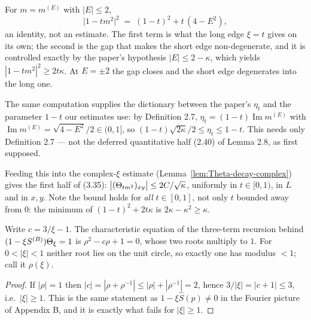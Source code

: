 \begin{lemma}\label{lem:edges}
  \leanok{}
  For $m = m^{(E)}$ with $|E|\le 2$,
  \[ \bigl|1 - t m^2\bigr|^2 \;=\; (1-t)^2 + t\,(4 - E^2) , \]
  an identity, not an estimate.  The first term is what the long edge $\xi = t$ gives on
  its own; the second is the gap that makes the short edge non-degenerate, and it is
  controlled exactly by the paper's hypothesis $|E| \le 2-\kappa$, which yields
  $|1 - tm^2|^2 \ge 2t\kappa$.  At $E = \pm 2$ the gap closes and the short edge
  degenerates into the long one.

  The same computation supplies the dictionary between the paper's $\eta_t$ and the
  parameter $1-t$ our estimates use: by Definition 2.7,
  $\eta_t = (1-t)\operatorname{Im}m^{(E)}$ with
  $\operatorname{Im}m^{(E)} = \sqrt{4-E^2}/2 \in (0,1]$, so
  $(1-t)\sqrt{2\kappa}/2 \le \eta_t \le 1-t$.  This needs only Definition 2.7 --- not the
  deferred quantitative half (2.40) of Lemma 2.8, as first supposed.

  Feeding this into the complex-$\xi$ estimate (Lemma~\ref{lem:Theta-decay-complex}) gives
  the first half of (3.35): $\bigl|(\Theta_{tm^2})_{xy}\bigr| \le 2C/\sqrt\kappa$, uniformly in
  $t\in[0,1)$, in $L$ and in $x,y$.  Note the bound holds for \emph{all} $t\in[0,1]$, not
  only $t$ bounded away from $0$: the minimum of $(1-t)^2+2t\kappa$ is $2\kappa-\kappa^2\ge\kappa$.
\end{lemma}

\begin{lemma}\label{lem:rho}
  \leanok{}
  Write $c = 3/\xi - 1$.  The characteristic equation of the three-term recursion
  behind $(1-\xi S^{(B)})\Theta_\xi = 1$ is $\rho^2 - c\rho + 1 = 0$, whose two roots
  multiply to $1$.  For $0 < |\xi| < 1$ neither root lies on the unit circle, so
  exactly one has modulus $< 1$; call it $\rho(\xi)$.
\end{lemma}
\begin{proof}\leanok{}
  If $|\rho| = 1$ then $|c| = |\rho + \rho^{-1}| \le |\rho| + |\rho^{-1}| = 2$,
  hence $3/|\xi| = |c+1| \le 3$, i.e.\ $|\xi| \ge 1$.  This is the same statement
  as $1 - \xi\widehat S(p) \ne 0$ in the Fourier picture of Appendix B, and it is
  exactly what fails for $|\xi| \ge 1$.
\end{proof}

